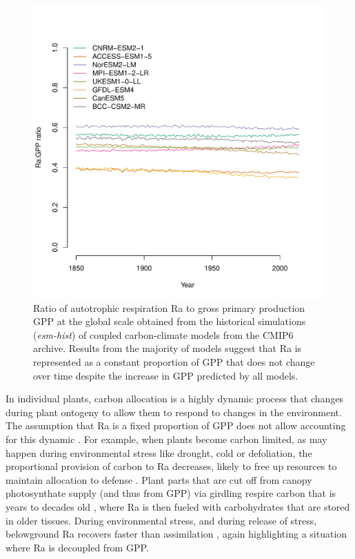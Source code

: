 \documentclass[12pt, a4paper]{article}
\begin{document}
\begin{figure}[htbp]
   \centering
   \includegraphics[scale=0.8]{annualRaGPP.pdf} %
   \caption{Ratio of autotrophic respiration Ra to gross primary production GPP at the global scale obtained from the historical simulations (\emph{esm-hist}) of coupled carbon-climate models from the CMIP6 archive. Results from the majority of models suggest that Ra is represented as a constant proportion of GPP that does not change over time despite the increase in GPP predicted by all models.}
   \label{fig:annualRaGPP}
\end{figure}

In individual plants, carbon allocation is a highly dynamic process that changes during plant ontogeny to allow them to respond to changes in the environment. The assumption that Ra is a fixed proportion of GPP does not allow accounting for this dynamic \citep{Collalti2019}. For example, when plants become carbon limited, as may happen during environmental stress like drought, cold or defoliation, the proportional provision of carbon to Ra decreases, likely to free up resources to maintain allocation to defense \citep{Huang2019EEB,Huang2019NP}. Plant parts that are cut off from canopy photosynthate supply (and thus from GPP) via girdling respire carbon that is years to decades old \citep{muhr:2013}, where Ra is then fueled with carbohydrates that are stored in older tissues. During environmental stress, and during release of stress, belowground Ra recovers faster than assimilation \citep{Hagedorn2016}, again highlighting a situation where Ra is decoupled from GPP.
\end{document}
